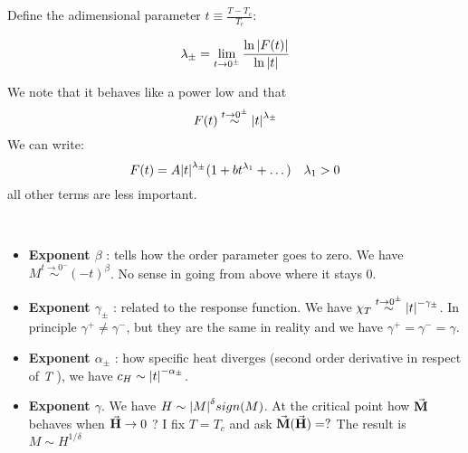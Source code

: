 \documentclass[../main/main.tex]{subfiles}
\begin{document}
Define the adimensional parameter \( t \equiv \frac{T-T_c}{T_c} \): \begin{definition}
\begin{equation}
  \lambda _{\pm} = \lim_{t \rightarrow 0^{\pm}} \frac{\ln{\abs{F(t)} } }{\ln{\abs{t} } }
  \label{eq:}
\end{equation}
\end{definition}
We note that it behaves like a power low and that
\begin{equation}
  F(t) \overset{t \rightarrow  0^{\pm}}{\sim } \abs{t}^{\lambda _{\pm}}
  \label{eq:}
\end{equation}
We can write:
\begin{equation}
  F(t) = A \abs{t}^{\lambda _{\pm}} ( 1 + bt^{\lambda _1}+ \dots) \quad \lambda _1 > 0
  \label{eq:}
\end{equation}
all other terms are less important.
\begin{definition}[Exponent]\
\begin{itemize}
\item \textbf{Exponent \( \beta \) }: tells how the order parameter goes to zero.
We have \( M \overset{t \rightarrow  0^-}{\sim} (-t)^{\beta }  \). No sense in going from above where it stays 0.
\item \textbf{Exponent \( \gamma _{\pm}  \) }: related to the response function. We have \( \chi _T \overset{t \rightarrow 0^{\pm}}{\sim} \abs{t}^{-\gamma _{\pm} }   \). In principle \( \gamma ^+ \neq \gamma ^-  \), but they are the same in reality and we have \( \gamma ^+ = \gamma ^- = \gamma     \).
\item \textbf{Exponent \( \alpha _{\pm} \) }: how specific heat diverges (second order derivative in respect of \emph{T} ), we have \( c_H \sim \abs{t}^{-\alpha _{\pm}}  \).
\item \textbf{Exponent \( \gamma   \)}. We have \( H \sim \abs{M}^{\delta } sign(M)  \). At the critical point how \( \va{M}  \) behaves when \( \va{H} \rightarrow 0  \) ? I fix \( T=T_c \) and ask \( \va{M}(\va{H} ) = ?  \)  The result is \( M \sim H^{1/\delta } \)
\end{itemize}
\end{definition}
\end{document}
